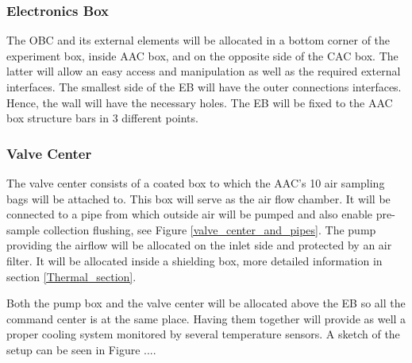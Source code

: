 \pagebreak
\subsubsection{Electronics Box}

The OBC and its external elements will be allocated in a bottom corner of the experiment box, inside AAC box, and on the opposite side of the CAC box. The latter will allow an easy access and manipulation as well as the required external interfaces. The smallest side of the EB will have the outer connections interfaces. Hence, the wall will have the necessary holes. The EB will be fixed to the AAC box structure bars in 3 different points.




\pagebreak
\subsubsection{Valve Center}

The valve center consists of a coated box to which the AAC's 10 air sampling bags will be attached to. This box will serve as the air flow chamber. It will be connected to a pipe from which outside air will be pumped and also enable pre-sample collection flushing, see Figure \ref{valve_center_and_pipes}. The pump providing the airflow will be allocated on the inlet side and protected by an air filter. It will be allocated inside a shielding box, more detailed information in section \ref{Thermal_section}.

\smallskip
Both the pump box and the valve center will be allocated above the EB so all the command center is at the same place. Having them together will provide as well a proper cooling system monitored by several temperature sensors. A sketch of the setup can be seen in Figure ....



